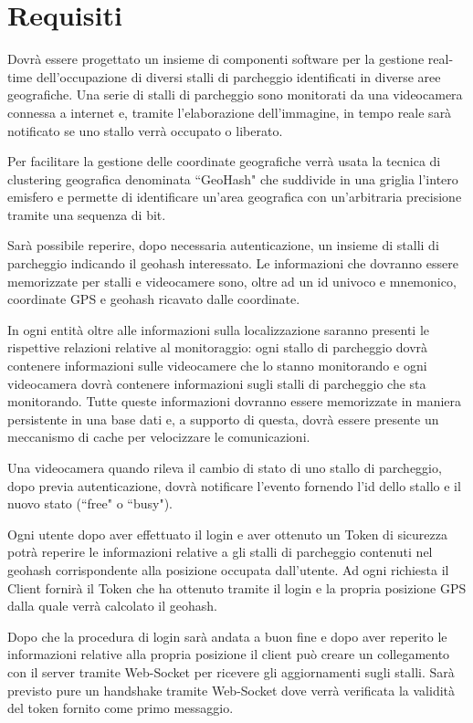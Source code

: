 \chapter{Requisiti}
Dovrà essere progettato un insieme di componenti software per la gestione real-time dell'occupazione di diversi stalli di parcheggio identificati in diverse aree geografiche.
Una serie di stalli di parcheggio sono monitorati da una videocamera connessa a internet e, tramite l'elaborazione dell'immagine, in tempo reale sarà notificato se uno stallo verrà occupato o liberato. 

Per facilitare la gestione  delle coordinate geografiche verrà usata la tecnica di clustering geografica denominata ``GeoHash" che suddivide in una griglia l'intero emisfero e permette di identificare un'area geografica con un'arbitraria precisione tramite una sequenza di bit. 

Sarà possibile reperire, dopo necessaria autenticazione, un insieme di stalli di parcheggio indicando il geohash interessato. Le informazioni che dovranno essere memorizzate per stalli e videocamere sono, oltre ad un id univoco e mnemonico, coordinate GPS e geohash ricavato dalle coordinate. 

In ogni entità oltre alle informazioni sulla localizzazione saranno presenti le rispettive relazioni relative al monitoraggio: ogni stallo di parcheggio dovrà contenere informazioni sulle videocamere che lo stanno monitorando e ogni videocamera dovrà contenere informazioni sugli stalli di parcheggio che sta monitorando.
Tutte queste informazioni dovranno essere memorizzate in maniera persistente in una base dati e, a supporto di questa, dovrà essere presente un meccanismo di cache per velocizzare le comunicazioni.

Una videocamera quando rileva il cambio di stato di uno stallo di parcheggio, dopo previa autenticazione, dovrà notificare l'evento fornendo l'id dello stallo e il nuovo stato (``free" o ``busy").

Ogni utente dopo aver effettuato il login e aver ottenuto un Token di sicurezza potrà reperire le informazioni relative a gli stalli di parcheggio contenuti nel geohash corrispondente alla posizione occupata dall'utente. Ad ogni richiesta il Client fornirà il Token che ha ottenuto tramite il login e la propria posizione GPS dalla quale verrà calcolato il geohash.

Dopo che la procedura di login sarà andata a buon fine e dopo aver reperito le informazioni relative alla propria posizione il client può creare un collegamento con il server tramite Web-Socket per ricevere gli aggiornamenti sugli stalli. Sarà previsto pure un handshake tramite Web-Socket dove verrà verificata la validità del token fornito come primo messaggio.





